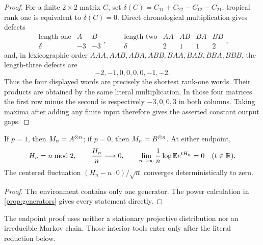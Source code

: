 \begin{proof}
For a finite $2\times2$ matrix $C$, set
$\delta(C)=C_{11}+C_{22}-C_{12}-C_{21}$; tropical rank one is equivalent
to $\delta(C)=0$.  Direct chronological multiplication gives defects
\[
\begin{array}{c|cc}
\text{length one}&A&B\\ \hline
\delta&-3&-3
\end{array},\qquad
\begin{array}{c|cccc}
\text{length two}&AA&AB&BA&BB\\ \hline
\delta&2&1&1&2
\end{array},
\]
and, in lexicographic order $AAA,AAB,ABA,ABB,BAA,BAB,BBA,BBB$, the
length-three defects are
\[
 -2,-1,0,0,0,0,-1,-2.
\]
Thus the four displayed words are precisely the shortest rank-one words.
Their products are obtained by the same literal multiplication.  In those
four matrices the first row minus the second is respectively
$-3,0,0,3$ in both columns.  Taking maxima after adding any finite input
therefore gives the asserted constant output gaps.
\end{proof}

\begin{corollary}
\label{cor:endpoints}
If $p=1$, then $M_n=A^{\otimes n}$; if $p=0$, then
$M_n=B^{\otimes n}$.  At either endpoint,
\[
 H_n=n\bmod2,\qquad \frac{H_n}{n}\longrightarrow0,
 \qquad
 \lim_{n\to\infty}\frac1n\log\mathbb{E} e^{tH_n}=0
 \quad(t\in\mathbb{R}).
\]
The centered fluctuation $(H_n-n\cdot0)/\sqrt n$ converges deterministically
to zero.
\end{corollary}

\begin{proof}
The environment contains only one generator.  The power calculation in
\cref{prop:generators} gives every statement directly.
\end{proof}

The endpoint proof uses neither a stationary projective distribution nor an
irreducible Markov chain.  Those interior tools enter only after the literal
reduction below.
